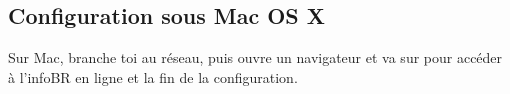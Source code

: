 



\subsection{Configuration sous Mac OS X}

Sur Mac, branche toi au réseau, puis ouvre un navigateur et va sur  pour accéder à l'infoBR en ligne et la fin de la configuration.


